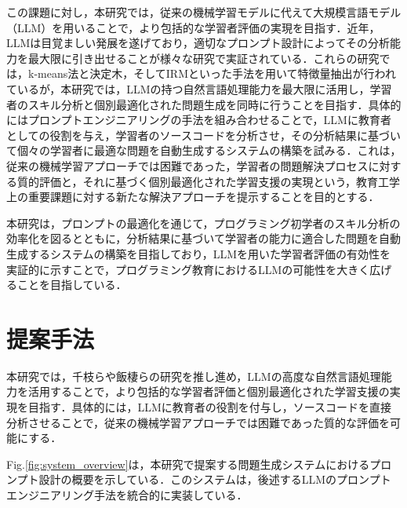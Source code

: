 \documentclass[twocolumn, fleqn, uplatex]{jsarticle}
\begin{document}
この課題に対し，本研究では，従来の機械学習モデルに代えて大規模言語モデル（LLM）を用いることで，より包括的な学習者評価の実現を目指す．近年，LLMは目覚ましい発展を遂げており，適切なプロンプト設計によってその分析能力を最大限に引き出せることが様々な研究で実証されている\cite{prompting servey}．これらの研究では，k-means法と決定木，そしてIRMといった手法を用いて特徴量抽出が行われているが，本研究では，LLMの持つ自然言語処理能力を最大限に活用し，学習者のスキル分析と個別最適化された問題生成を同時に行うことを目指す．具体的にはプロンプトエンジニアリングの手法を組み合わせることで，LLMに教育者としての役割を与え，学習者のソースコードを分析させ，その分析結果に基づいて個々の学習者に最適な問題を自動生成するシステムの構築を試みる．これは，従来の機械学習アプローチでは困難であった，学習者の問題解決プロセスに対する質的評価と，それに基づく個別最適化された学習支援の実現という，教育工学上の重要課題に対する新たな解決アプローチを提示することを目的とする．

本研究は，プロンプトの最適化を通じて，プログラミング初学者のスキル分析の効率化を図るとともに，分析結果に基づいて学習者の能力に適合した問題を自動生成するシステムの構築を目指しており，LLMを用いた学習者評価の有効性を実証的に示すことで，プログラミング教育におけるLLMの可能性を大きく広げることを目指している．

\section{提案手法}
本研究では，千枝ら\cite{chieda}や飯棲ら\cite{izumi}の研究を推し進め，LLMの高度な自然言語処理能力を活用することで，より包括的な学習者評価と個別最適化された学習支援の実現を目指す．具体的には，LLMに教育者の役割を付与し，ソースコードを直接分析させることで，従来の機械学習アプローチでは困難であった質的な評価を可能にする．

Fig.\ref{fig:system_overview}は，本研究で提案する問題生成システムにおけるプロンプト設計の概要を示している．このシステムは，後述するLLMのプロンプトエンジニアリング手法を統合的に実装している．
\end{document}
